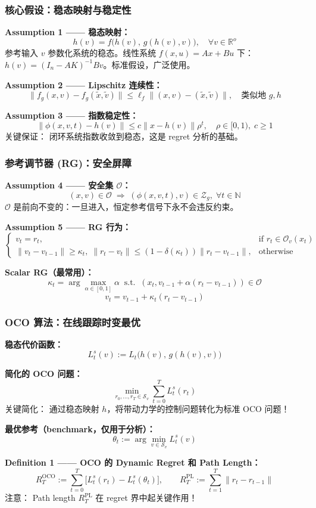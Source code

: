 \documentclass{ltx-talk}
\begin{document}
\begin{frame}
\frametitle{核心假设：稳态映射与稳定性}

\textbf{Assumption 1 —— 稳态映射：}
\[
    h(v) = f\bigl(h(v),\, g(h(v), v)\bigr), \quad \forall v \in \mathbb{R}^o
\]
\small
参考输入 $v$ 参数化系统的稳态。线性系统 $f(x,u)=Ax+Bu$ 下：
$h(v) = (I_n - AK)^{-1}Bv$。\textcolor{myblue}{标准假设，广泛使用。}

\normalsize
\textbf{Assumption 2 —— Lipschitz 连续性：}
\[
    \|f_g(x,v) - f_g(\tilde{x},\tilde{v})\| \le \ell_f \|(x,v) - (\tilde{x},\tilde{v})\|, \quad \text{类似地 } g, h
\]

\textbf{Assumption 3 —— 指数稳定性：}
\[
    \|\phi(x,v,t) - h(v)\| \le c\|x - h(v)\| \rho^t, \quad \rho \in [0,1),\; c \ge 1
\]
\small
\textcolor{myred}{关键保证：} 闭环系统指数收敛到稳态，这是 regret 分析的基础。
\end{frame}

\begin{frame}
\frametitle{参考调节器 (RG)：安全屏障}

\textbf{Assumption 4 —— 安全集 $\mathcal{O}$：}
\[
    (x,v) \in \mathcal{O} \;\Longrightarrow\; (\phi(x,v,t), v) \in \mathcal{Z}_g,\; \forall t \in \mathbb{N}
\]
\small
$\mathcal{O}$ 是前向不变的：一旦进入，恒定参考信号下永不会违反约束。

\vspace{2mm}
\textbf{Assumption 5 —— RG 行为：}
\[
    \begin{cases}
        v_t = r_t, & \text{if } r_t \in \mathcal{O}_v(x_t) \\[6pt]
        \|v_t - v_{t-1}\| \ge \kappa_t, \; \|r_t - v_t\| \le (1 - \delta(\kappa_t))\|r_t - v_{t-1}\|, & \text{otherwise}
    \end{cases}
\]

\vspace{2mm}
\textbf{Scalar RG（最常用）：}
\[
    \kappa_t = \arg\max_{\alpha \in [0,1]} \alpha \;\; \text{s.t.} \;\; (x_t, v_{t-1} + \alpha(r_t - v_{t-1})) \in \mathcal{O}
\]
\[
    v_t = v_{t-1} + \kappa_t(r_t - v_{t-1})
\]
\end{frame}

\begin{frame}
\frametitle{OCO 算法：在线跟踪时变最优}

\textbf{稳态代价函数：}
\[
    L_t^s(v) := L_t\bigl(h(v),\, g(h(v), v)\bigr)
\]

\textbf{简化的 OCO 问题：}
\[
    \min_{r_0,\dots,r_T \in \mathcal{S}_v} \sum_{t=0}^{T} L_t^s(r_t)
\]
\small
\textcolor{myblue}{关键简化：} 通过稳态映射 $h$，将带动力学的控制问题转化为标准 OCO 问题！

\normalsize
\textbf{最优参考（benchmark，仅用于分析）：}
\[
    \theta_t := \arg\min_{v \in \mathcal{S}_v} L_t^s(v)
\]

\textbf{Definition 1 —— OCO 的 Dynamic Regret 和 Path Length：}
\[
    R_T^{\text{OCO}} := \sum_{t=0}^{T} \bigl[L_t^s(r_t) - L_t^s(\theta_t)\bigr], \qquad
    R_T^{\text{PL}} := \sum_{t=1}^{T} \|r_t - r_{t-1}\|
\]
\small
\textcolor{myred}{注意：} Path length $R_T^{\text{PL}}$ 在 regret 界中起关键作用！
\end{frame}
\end{document}
